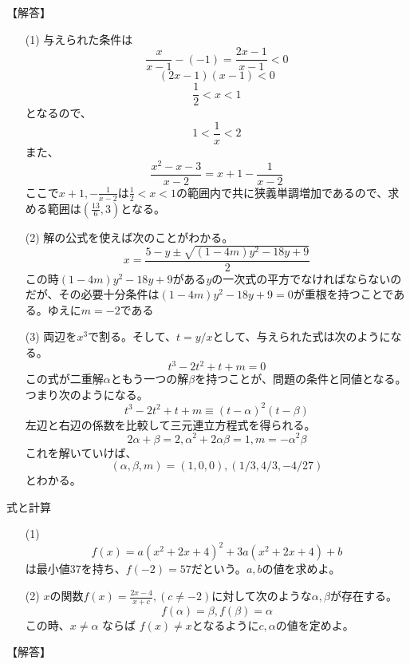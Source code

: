 \documentclass[a4paper,fleqn,dvipdfmx]{jsarticle}
\begin{document}
\begin{flushleft}
【解答】
\end{flushleft}

\begin{itemize}
    \item [(1)] 与えられた条件は
    $$\frac{x}{x-1}-(-1)=\frac{2x-1}{x-1}<0$$
    $$(2x-1)(x-1)<0$$
    $$\frac{1}{2}<x<1$$
    となるので、
    $$1<\frac{1}{x}<2$$
    また、
    $$\frac{x^2-x-3}{x-2}=x+1-\frac{1}{x-2}$$
    ここで$x+1,-\frac{1}{x-2}$は$\frac{1}{2}<x<1$の範囲内で共に狭義単調増加であるので、求める範囲は$(\frac{13}{6},3)$となる。
    \item [(2)] 解の公式を使えば次のことがわかる。$$x=\frac{5-y\pm \sqrt{(1-4m)y^2-18y+9}}{2}$$
    この時$(1-4m)y^2-18y+9$がある$y$の一次式の平方でなければならないのだが、その必要十分条件は$(1-4m)y^2-18y+9=0$が重根を持つことである。ゆえに$m=-2$である
    \item [(3)] 両辺を$x^3$で割る。そして、$t=y/x$として、与えられた式は次のようになる。$$t^3-2t^2+t+m=0$$この式が二重解$\alpha$ともう一つの解$\beta$を持つことが、問題の条件と同値となる。つまり次のようになる。$$t^3-2t^2+t+m\equiv (t-\alpha)^2(t-\beta)$$左辺と右辺の係数を比較して三元連立方程式を得られる。
    $$2\alpha+\beta=2,\alpha^2+2\alpha\beta=1,m=-\alpha^2\beta$$
    これを解いていけば、$$(\alpha,\beta,m)=(1,0,0),(1/3,4/3,-4/27)$$とわかる。
    
\end{itemize}



\newpage
\begin{itembox}[l]{式と計算}
\begin{itemize}
    \item [(1)] $$f(x)=a(x^2+2x+4)^2+3a(x^2+2x+4)+b$$は最小値37を持ち、$f(-2)=57$だという。$a,b$の値を求めよ。
    \item [(2)] $x$の関数$f(x)=\displaystyle\frac{2x-4}{x+c},(c\neq -2)$に対して次のような$\alpha,\beta$が存在する。
    $$f(\alpha)=\beta,f(\beta)=\alpha$$
    この時、$x \neq \alpha$ ならば $f(x) \neq x$となるように$c,\alpha$の値を定めよ。
\end{itemize}
\end{itembox}

\begin{flushleft}
【解答】
\end{flushleft}
\end{document}
